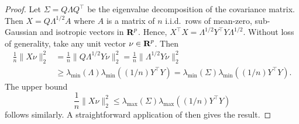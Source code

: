 \documentclass{article}
\begin{document}
\begin{proof}
Let $\Sigma = Q \Lambda Q^\top$ be the eigenvalue decomposition of the
covariance matrix. Then $X = Q \Lambda^{1/2} A$ where $A$ is a matrix of $n$
i.i.d.\ rows of mean-zero, sub-Gaussian and isotropic vectors in ${\mbox{\bf R}}^p$.
Hence, $X^\top X = \Lambda^{1/2} Y^\top Y \Lambda^{1/2}$. Without loss of
generality, take any unit vector $\nu \in {\mbox{\bf R}}^p$. Then 
\[
    \begin{aligned}
        \frac{1}{n}\|X \nu\|_2^2  &= \frac{1}{n} \|Q \Lambda^{1/2}Y \nu\|_2^2 = \frac{1}{n} \|\Lambda^{1/2} Y \nu\|_2^2 \\ 
        &\geq \lambda_\mathrm{min}(\Lambda) \lambda_\mathrm{min}((1/n) Y^\top Y) = \lambda_\mathrm{min}(\Sigma) \lambda_\mathrm{min}((1/n) Y^\top Y).
    \end{aligned}
\]
The upper bound
\[
    \frac{1}{n}\|X \nu\|_2^2 \leq \lambda_\mathrm{max}(\Sigma)\lambda_\mathrm{max}((1/n) Y^\top Y)
\]
follows similarly. A straightforward application of
\cite[Corollary~5.35]{Vershynin11} then gives the result.
\end{proof}
\end{document}
